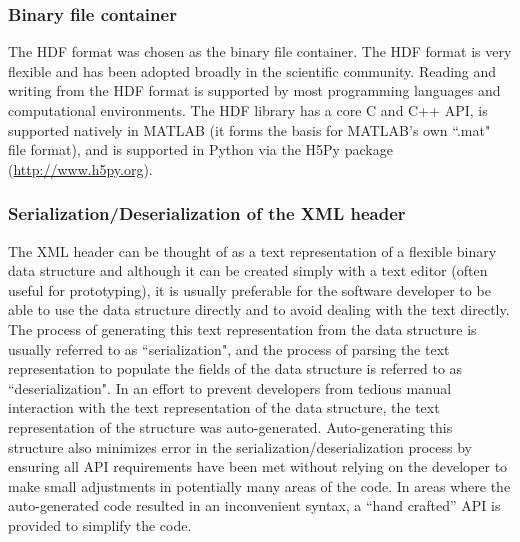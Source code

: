 \documentclass[12pt]{article}
\begin{document}
\subsubsection*{Binary file container}
The HDF format was chosen as the binary file container.  The HDF format is very flexible and has been adopted broadly in the scientific community.  Reading and writing from the HDF format is supported by most programming languages and computational environments.  The HDF library has a core C and C++ API, is supported natively in MATLAB (it forms the basis for MATLAB's own ``.mat" file format), and is supported in Python via the H5Py package (\url{http://www.h5py.org}).

\subsubsection*{Serialization/Deserialization of the XML header}
The XML header can be thought of as a text representation of a flexible binary data structure and although it can be created simply with a text editor (often useful for prototyping), it is usually preferable for the software developer to be able to use the data structure directly and to avoid dealing with the text directly.  
The process of generating this text representation from the data structure is usually referred to as ``serialization", and the process of parsing the text representation to populate the fields of the data structure is referred to as ``deserialization".  
In an effort to prevent developers from tedious manual interaction with the text representation of the data structure, the text representation of the structure was auto-generated.
Auto-generating this structure also minimizes error in the serialization/deserialization process by ensuring all API requirements have been met without relying on the developer to make small adjustments in potentially many areas of the code.
In areas where the auto-generated code resulted in an inconvenient syntax, a ``hand crafted'' API is provided to simplify the code.
\end{document}

